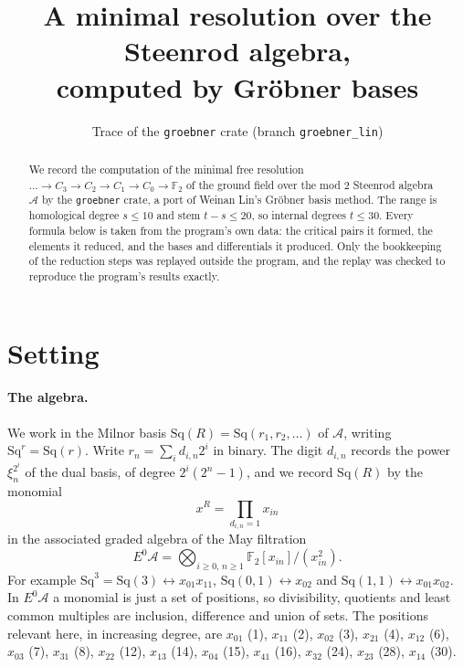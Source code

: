 \documentclass[11pt]{article}
\title{A minimal resolution over the Steenrod algebra,\\ computed by Gröbner bases}
\author{Trace of the \texttt{groebner} crate (branch \texttt{groebner\_lin})}
\date{}
\newcommand{\Sq}{\mathrm{Sq}}
\newcommand{\F}{\mathbb{F}_2}
\newcommand{\A}{\mathcal{A}}
\begin{document}
\maketitle

\begin{abstract}
We record the computation of the minimal free resolution
$\dots \to C_3 \to C_2 \to C_1 \to C_0 \to \F$ of the ground field over the mod $2$ Steenrod
algebra $\A$ by the \texttt{groebner} crate, a port of Weinan Lin's Gröbner basis method. The
range is homological degree $s \le 10$ and stem $t - s \le 20$, so internal degrees $t \le 30$.
Every formula below is taken from the program's own data: the critical pairs it formed, the
elements it reduced, and the bases and differentials it produced. Only the bookkeeping of the
reduction steps was replayed outside the program, and the replay was checked to reproduce the
program's results exactly.
\end{abstract}

\section{Setting}

\paragraph{The algebra.}
We work in the Milnor basis $\Sq(R) = \Sq(r_1, r_2, \dots)$ of $\A$, writing $\Sq^r = \Sq(r)$.
Write $r_n = \sum_i d_{i,n} 2^i$ in binary. The digit $d_{i,n}$ records the power
$\xi_n^{2^i}$ of the dual basis, of degree $2^i(2^n - 1)$, and we record $\Sq(R)$ by the
monomial
\[ x^R = \prod_{d_{i,n} = 1} x_{in} \]
in the associated graded algebra of the May filtration
\[ E^0\A = \bigotimes_{i \ge 0,\, n \ge 1} \F[x_{in}]/(x_{in}^2). \]
For example $\Sq^3 = \Sq(3) \leftrightarrow x_{01}x_{11}$, $\Sq(0,1) \leftrightarrow x_{02}$ and
$\Sq(1,1) \leftrightarrow x_{01}x_{02}$. In $E^0\A$ a monomial is just a set of positions, so
divisibility, quotients and least common multiples are inclusion, difference and union of sets.
The positions relevant here, in increasing degree, are
$x_{01}$ (1), $x_{11}$ (2), $x_{02}$ (3), $x_{21}$ (4), $x_{12}$ (6), $x_{03}$ (7), $x_{31}$ (8), $x_{22}$ (12), $x_{13}$ (14), $x_{04}$ (15), $x_{41}$ (16), $x_{32}$ (24), $x_{23}$ (28), $x_{14}$ (30).
\end{document}
